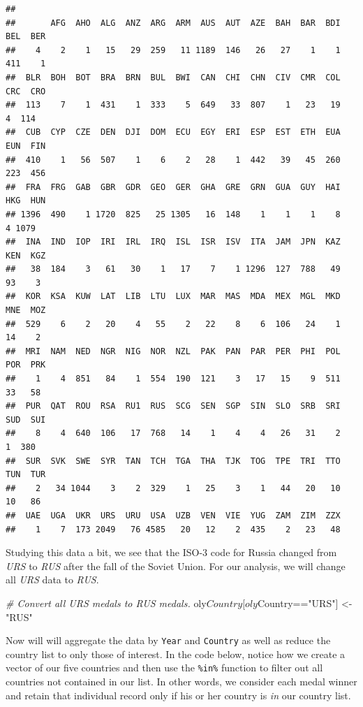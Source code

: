 \documentclass[]{book}
\newenvironment{Shaded}{\begin{snugshade}}{\end{snugshade}}
\newcommand{\StringTok}[1]{\textcolor[rgb]{0.31,0.60,0.02}{{#1}}}
\newcommand{\CommentTok}[1]{\textcolor[rgb]{0.56,0.35,0.01}{\textit{{#1}}}}
\newcommand{\NormalTok}[1]{{#1}}
\begin{document}
\begin{verbatim}
## 
##       AFG  AHO  ALG  ANZ  ARG  ARM  AUS  AUT  AZE  BAH  BAR  BDI  BEL  BER 
##    4    2    1   15   29  259   11 1189  146   26   27    1    1  411    1 
##  BLR  BOH  BOT  BRA  BRN  BUL  BWI  CAN  CHI  CHN  CIV  CMR  COL  CRC  CRO 
##  113    7    1  431    1  333    5  649   33  807    1   23   19    4  114 
##  CUB  CYP  CZE  DEN  DJI  DOM  ECU  EGY  ERI  ESP  EST  ETH  EUA  EUN  FIN 
##  410    1   56  507    1    6    2   28    1  442   39   45  260  223  456 
##  FRA  FRG  GAB  GBR  GDR  GEO  GER  GHA  GRE  GRN  GUA  GUY  HAI  HKG  HUN 
## 1396  490    1 1720  825   25 1305   16  148    1    1    1    8    4 1079 
##  INA  IND  IOP  IRI  IRL  IRQ  ISL  ISR  ISV  ITA  JAM  JPN  KAZ  KEN  KGZ 
##   38  184    3   61   30    1   17    7    1 1296  127  788   49   93    3 
##  KOR  KSA  KUW  LAT  LIB  LTU  LUX  MAR  MAS  MDA  MEX  MGL  MKD  MNE  MOZ 
##  529    6    2   20    4   55    2   22    8    6  106   24    1   14    2 
##  MRI  NAM  NED  NGR  NIG  NOR  NZL  PAK  PAN  PAR  PER  PHI  POL  POR  PRK 
##    1    4  851   84    1  554  190  121    3   17   15    9  511   33   58 
##  PUR  QAT  ROU  RSA  RU1  RUS  SCG  SEN  SGP  SIN  SLO  SRB  SRI  SUD  SUI 
##    8    4  640  106   17  768   14    1    4    4   26   31    2    1  380 
##  SUR  SVK  SWE  SYR  TAN  TCH  TGA  THA  TJK  TOG  TPE  TRI  TTO  TUN  TUR 
##    2   34 1044    3    2  329    1   25    3    1   44   20   10   10   86 
##  UAE  UGA  UKR  URS  URU  USA  UZB  VEN  VIE  YUG  ZAM  ZIM  ZZX 
##    1    7  173 2049   76 4585   20   12    2  435    2   23   48
\end{verbatim}

Studying this data a bit, we see that the ISO-3 code for Russia changed
from \emph{URS} to \emph{RUS} after the fall of the Soviet Union. For
our analysis, we will change all \emph{URS} data to \emph{RUS}.

\begin{Shaded}
\begin{Highlighting}[]
\CommentTok{# Convert all URS medals to RUS medals.}
\NormalTok{oly$Country[oly$Country==}\StringTok{"URS"}\NormalTok{] <-}\StringTok{ "RUS"}
\end{Highlighting}
\end{Shaded}

Now will will aggregate the data by \texttt{Year} and \texttt{Country}
as well as reduce the country list to only those of interest. In the
code below, notice how we create a vector of our five countries and then
use the \texttt{\%in\%} function to filter out all countries not
contained in our list. In other words, we consider each medal winner and
retain that individual record only if his or her country is \emph{in}
our country list.
\end{document}
